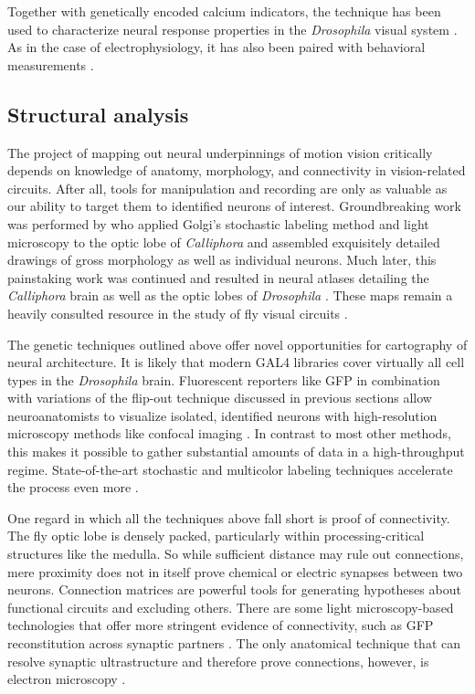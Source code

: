 Together with genetically encoded calcium indicators, the technique has been used to characterize neural response properties in the \textit{Drosophila} visual system \citep{Reiff:2010eo,Clark:2011gw}. As in the case of electrophysiology, it has also been paired with behavioral measurements \citep{Seelig:2010aa,Seelig:2013in}.

\subsection{Structural analysis}


The project of mapping out neural underpinnings of motion vision critically depends on knowledge of anatomy, morphology, and connectivity in vision-related circuits. After all, tools for manipulation and recording are only as valuable as our ability to target them to identified neurons of interest. Groundbreaking work was performed by \citet{Cajal:1915aa} who applied Golgi's stochastic labeling method and light microscopy to the optic lobe of \textit{Calliphora} and assembled exquisitely detailed drawings of gross morphology as well as individual neurons. Much later, this painstaking work was continued and resulted in neural atlases detailing the \textit{Calliphora} brain \citep{Strausfeld:1976aa} as well as the optic lobes of \textit{Drosophila} \citep{Fischbach:1989uw,Bausenwein:1992vx}. These maps remain a heavily consulted resource in the study of fly visual circuits \citep[see also recent efforts regarding nomenclature by][]{Ito:2014aa}.

The genetic techniques outlined above offer novel opportunities for cartography of neural architecture. It is likely that modern GAL4 libraries cover virtually all cell types in the \textit{Drosophila} brain. Fluorescent reporters like GFP in combination with variations of the flip-out technique discussed in previous sections allow neuroanatomists to visualize isolated, identified neurons with high-resolution microscopy methods like confocal imaging \citep{Minsky:1988aa,Venken:2011hf}. In contrast to most other methods, this makes it possible to gather substantial amounts of data in a high-throughput regime. State-of-the-art stochastic and multicolor labeling techniques accelerate the process even more \citep{Hampel:2011aa,Hadijeconomou:2011aa,Raghu:2011iy,Nern:2015aa,Mauss:2015kj}.

One regard in which all the techniques above fall short is proof of connectivity. The fly optic lobe is densely packed, particularly within processing-critical structures like the medulla. So while sufficient distance may rule out connections, mere proximity does not in itself prove chemical or electric synapses between two neurons. Connection matrices are powerful tools for generating hypotheses about functional circuits and excluding others. There are some light microscopy-based technologies that offer more stringent evidence of connectivity, such as GFP reconstitution across synaptic partners \citep[GRASP;][]{Feinberg:2008aa}. The only anatomical technique that can resolve synaptic ultrastructure and therefore prove connections, however, is electron microscopy \citep{Knoll:1932aa}.

